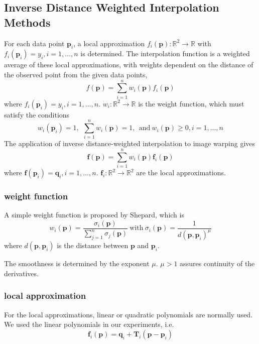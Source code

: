 \documentclass[12pt]{article}
\begin{document}
\subsection{Inverse Distance Weighted Interpolation Methods}
For each data point $\mathbf{p}_i$, a local approximation $f_i(\mathbf{p}):\mathbb{R}^2\rightarrow\mathbb{R}$ with $f_i(\mathbf{p}_i)=y_i, i=1,...,n$ is determined. The interpolation function is a weighted average of these local approximations, with weights dependent on the distance of the observed point from the given data points,
\begin{equation}
    f(\mathbf{p})=\sum_{i=1}^nw_i(\mathbf{p})f_i(\mathbf{p})
\end{equation}
where $f_i(\mathbf{p}_i)=y_i,i=1,...,n.$  $w_i:\mathbb{R}^2\rightarrow\mathbb{R}$ is the weight function, which must satisfy the conditions
\begin{equation}
    w_i(\mathbf{p}_i)=1,\ \ \sum_{i=1}^nw_i(\mathbf{p})=1,\ \ \mathrm{and}\ w_i(\mathbf{p})\ge0, i=1,...,n
\end{equation}
The application of inverse distance-weighted interpolation to image warping gives
\begin{equation}
    \mathbf{f}(\mathbf{p})=\sum_{i=1}^nw_i(\mathbf{p})\mathbf{f}_i(\mathbf{p})
\end{equation}
where $\mathbf{f}(\mathbf{p}_i)=\mathbf{q}_i,i=1,...,n$. $\mathbf{f}_i:\mathbb{R}^2\rightarrow\mathbb{R}^2$ are the local approximations.


\subsubsection*{weight function}
A simple weight function is proposed by Shepard, which is
\begin{equation}
    \displaystyle w_i(\mathbf{p})=\frac{\sigma_i(\mathbf{p})}{\sum\limits_{j=1}^n\sigma_j(\mathbf{p})}\ \mathrm{with}\ \sigma_i(\mathbf{p})=\frac{1}{d(\mathbf{p},\mathbf{p}_i)^\mu}\label{con:inventoryflow}
\end{equation}
where $d(\mathbf{p},\mathbf{p}_i)$ is the distance between $\mathbf{p}$ and $\mathbf{p}_i$.

The smoothness is determined by the exponent $\mu$. $\mu>1$ assures continuity of the derivatives.
\subsubsection*{local approximation}
For the local approximations, linear or quadratic polynomials are normally used. We used the linear polynomials in our experiments, i.e.
\begin{equation}
    \mathbf{f}_i(\mathbf{p})=\mathbf{q}_i+\mathbf{T}_i(\mathbf{p}-\mathbf{p}_i)
\end{equation}
\end{document}
